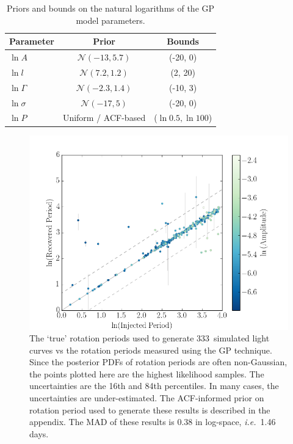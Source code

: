 \documentclass[useAMS, usenatbib, preprint, 12pt]{aastex}
\newcommand{\naigrain}{333}
\newcommand{\ie}{{\it i.e.}}
\begin{document}
\begin{table}
\begin{center}
\caption{Priors and bounds on the natural logarithms of the GP model
    parameters.}
\begin{tabular}{lcc}
Parameter & Prior & Bounds\\
    \hline
    $\ln A$ & $\mathcal N(-13, 5.7)$ & (-20, 0) \\
    $\ln l$ & $\mathcal N(7.2, 1.2)$ & (2, 20) \\
    $\ln \Gamma$ & $\mathcal N(-2.3, 1.4)$ & (-10, 3) \\
    $\ln \sigma$ & $\mathcal N(-17, 5)$ & (-20, 0) \\
    $\ln P $ & Uniform / ACF-based & ($\ln 0.5, \ln 100$) \\
\end{tabular}
\end{center}
\end{table}
\label{tab:priors}

\begin{figure}
\begin{center}
\includegraphics[width=6in, clip=true]{figures/comparison_emcee3_24_0.png}
\caption{The `true' rotation periods used to generate \naigrain\
simulated light curves vs the rotation periods measured using the GP
technique.
Since the posterior PDFs of rotation periods are often non-Gaussian,
the points plotted here are the highest likelihood samples.
The uncertainties are the 16th and 84th percentiles.
In many cases, the uncertainties are under-estimated.
The ACF-informed prior on rotation period used to generate these results is
    described in the appendix.
The MAD of these results is 0.38 in log-space, \ie\ 1.46 days.
    }
\label{fig:compare_mcmc_acfprior}
\end{center}
\end{figure}
\end{document}
